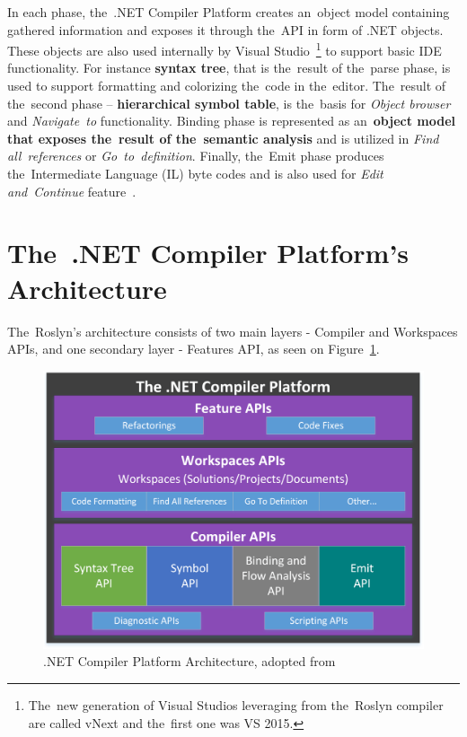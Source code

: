 \documentclass[
  digital, %
  table,   %
  lof,     %
  lot,     %
  oneside,
]{fithesis3}
\begin{document}
In each phase, the~.NET Compiler Platform creates an~object model containing gathered information and exposes it through the~API in form of .NET objects. These objects are also used internally by Visual Studio~\footnote{The~new generation of Visual Studios leveraging from the~Roslyn compiler are called vNext and the~first one was VS 2015.} to support basic IDE functionality. For instance \textbf{syntax tree}, that is the~result of the~parse phase, is used to support formatting and colorizing the~code in the~editor. The~result of the~second phase -- \textbf{hierarchical symbol table}, is the~basis for \textit{Object browser} and \textit{Navigate~to} functionality. Binding phase is represented as an~\textbf{object model that exposes the~result of the~semantic analysis} and is utilized in \textit{Find all~references} or \textit{Go~to~definition}. Finally, the~Emit phase produces the~Intermediate Language (IL) byte codes and is also used for \textit{Edit and~Continue} feature~\cite{roslyn-overview}.

\section{The~.NET Compiler Platform's Architecture}
The~Roslyn's architecture consists of two main layers - Compiler and Workspaces APIs, and one secondary layer - Features API, as seen on Figure~\ref{fig:roslyn-compiler-architecture}.

\begin{figure}[h!]
		\centering
			\includegraphics[scale=0.85]{img/roslyn-compiler-architecture}
		\caption{.NET Compiler Platform Architecture, adopted from~\cite{roslyn-succinctly}}
		\label{fig:roslyn-compiler-architecture}
\end{figure}
\end{document}
